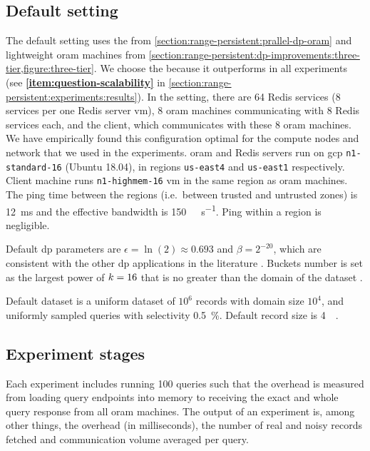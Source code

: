 	\subsection{Default setting}\label{section:range-persistent:experiments:default-setting}

		The default setting uses the \protocolGamma{} from \cref{section:range-persistent:prallel-dp-oram} and lightweight \acrshort{oram} machines from \cref{section:range-persistent:dp-improvements:three-tier,figure:three-tier}.
		We choose the \protocolGamma{} because it outperforms \protocolNoGamma{} in all experiments (see \textbf{\ref{item:question-scalability}} in \cref{section:range-persistent:experiments:results}).
		In the setting, there are 64 Redis services (8 services per one Redis server \acrshort{vm}), 8 \acrshort{oram} machines communicating with 8 Redis services each, and the client, which communicates with these 8 \acrshort{oram} machines.
		We have empirically found this configuration optimal for the compute nodes and network that we used in the experiments.
		\acrshort{oram} and Redis servers run on \acrshort{gcp} \texttt{n1-standard-16}  (Ubuntu 18.04), in regions \texttt{us-east4} and \texttt{us-east1} respectively.
		Client machine runs \texttt{n1-highmem-16} \acrshort{vm} in the same region as \acrshort{oram} machines.
		The ping time between the regions (i.e.\ between trusted and untrusted zones) is \SI{12}{\milli\second} and the effective bandwidth is \SI{150}{\mega\byte\per\second}.
		Ping within a region is negligible.

		Default \acrshort{dp} parameters are $\epsilon = \ln(2) \approx \num{0.693}$ and $\beta = 2^{-20}$, which are consistent with the other \acrshort{dp} applications in the literature \cite{choosing-epsilon}.
		Buckets number is set as the largest power of $k = 16$ that is no greater than the domain of the dataset \domainSize{}.

		Default dataset is a uniform dataset of $10^6$ records with domain size $10^4$, and uniformly sampled queries with selectivity \SI{0.5}{\percent}.
		Default record size is \SI{4}{\kibi\byte}.

	\subsection{Experiment stages}

		Each experiment includes running 100 queries such that the overhead is measured from loading query endpoints into memory to receiving the exact and whole query response from all \acrshort{oram} machines.
		The output of an experiment is, among other things, the overhead (in milliseconds), the number of real and noisy records fetched and communication volume averaged per query.

